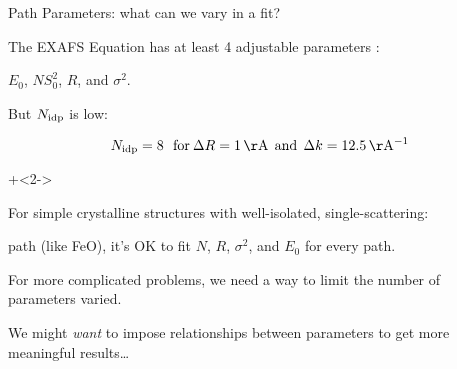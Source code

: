 \begin{slide}{Path Parameters: what can we vary in a fit?}

\begin{cenpage}{125mm}
  The EXAFS Equation has at least 4 adjustable parameters {}:

  \vmm
\begin{center}
  $E_0$, $NS_0^2$, $R$, and $\sigma^2$.
\end{center}

  \vmm

  But $N_{\rm idp}$  is low:

  \[ N_{\rm idp} = 8 \> \> \>
  {\rm for} \> \Delta R = 1 \, {\rm \AA} \>\> {\rm and} \>\> \Delta k = 12.5\,
  {\rm \AA^{-1} } \]

  \vmm\onslide+<2->

  For simple crystalline structures with well-isolated, single-scattering:

  path (like FeO), it's OK to fit $N$, $R$, $\sigma^2$, and $E_0$ for every
  path.

  \vmm

  For more complicated problems, we need a way to limit the number of
  parameters varied.

  \vmm

  We might {\emph{want}} to impose relationships between parameters to get
  more meaningful results\ldots


\end{cenpage}
\vfill
\end{slide}
